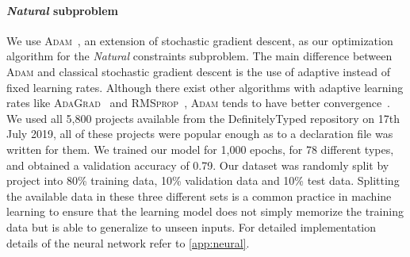 \documentclass[sigplan,10pt,review,anonymous]{acmart} %
\theoremstyle{plain}
\theoremstyle{remark}
\theoremstyle{definition}
\begin{document}
\paragraph{\textit{Natural} subproblem} We use \textsc{Adam}~\cite{kingma2014}, an extension of stochastic gradient descent,
as our optimization algorithm for the \textit{Natural} constraints subproblem.
%
The main difference between \textsc{Adam} and classical stochastic gradient descent
is the use of adaptive instead of fixed learning rates.
%
Although there exist other algorithms with adaptive learning rates
like \textsc{AdaGrad}~\cite{duchi2011} and \textsc{RMSprop}~\cite{tieleman2014},
\textsc{Adam} tends to have better convergence~\cite{ruder2016}.
We used all 5,800 projects available from the DefinitelyTyped repository on 17th July 2019, all of these projects were popular enough as to a declaration file was written for them.
%
We trained our model for 1,000 epochs, for 78 different types,
and obtained a validation accuracy of 0.79.
%
%
Our dataset was randomly split by project into 80\% training data,
10\% validation data and 10\% test data.
%
Splitting the available data in these three different sets is a common practice in machine learning
to ensure that the learning model does not simply memorize the training data
but is able to generalize to unseen inputs. For detailed implementation details of the neural network refer to \cref{app:neural}.

%     
\end{document}
